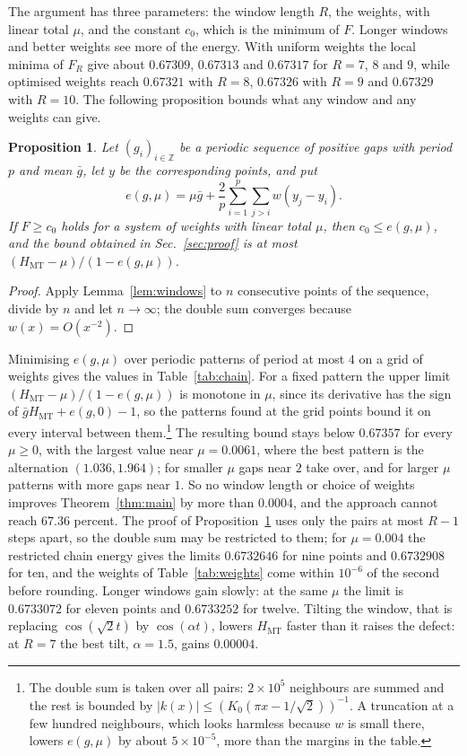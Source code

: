 \documentclass[aps,prd,twocolumn,superscriptaddress,nofootinbib,longbibliography,floatfix,showkeys,amsmath,amssymb,10pt]{revtex4-2}
\newtheorem{proposition}[theorem]{Proposition}
\theoremstyle{definition}
\theoremstyle{remark}
\newcommand{\Z}{\mathbb{Z}}
\newcommand{\MT}{\mathrm{MT}}
\begin{document}
The argument has three parameters: the window length $R$, the weights,
with linear total $\mu$, and the constant $c_0$, which is the minimum of
$F$. Longer windows and better weights see more of the energy. With
uniform weights the local minima of $F_R$ give about $0.67309$, $0.67313$
and $0.67317$ for $R=7$, $8$ and $9$, while optimised weights reach
$0.67321$ with $R=8$, $0.67326$ with $R=9$ and $0.67329$ with $R=10$. The following
proposition bounds what any window and any weights can give.

\begin{proposition}\label{prop:limit}
Let $(g_i)_{i\in\Z}$ be a periodic sequence of positive gaps with period
$p$ and mean $\bar g$, let $y$ be the corresponding points, and put
\[
 e(g,\mu)=\mu\bar g+\frac2p\sum_{i=1}^p\sum_{j>i}w(y_j-y_i).
\]
If $F\ge c_0$ holds for a system of weights with linear total $\mu$, then
$c_0\le e(g,\mu)$, and
the bound obtained in Sec.~\ref{sec:proof} is at most
$(H_\MT-\mu)/(1-e(g,\mu))$.
\end{proposition}

\begin{proof}
Apply Lemma~\ref{lem:windows} to $n$ consecutive points of the sequence,
divide by $n$ and let $n\to\infty$; the double sum converges because
$w(x)=O(x^{-2})$.
\end{proof}

Minimising $e(g,\mu)$ over periodic patterns of period at most $4$ on a
grid of weights gives the values in Table~\ref{tab:chain}. For a fixed
pattern the upper limit $(H_\MT-\mu)/(1-e(g,\mu))$ is monotone in $\mu$,
since its derivative has the sign of $\bar gH_\MT+e(g,0)-1$, so the
patterns found at the grid points bound it on every interval between
them.\footnote{The double sum is taken over all pairs: $2\times10^5$
neighbours are summed and the rest is bounded by
$|k(x)|\le(K_0(\pi x-1/\sqrt2))^{-1}$. A truncation at a few hundred
neighbours, which looks harmless because $w$ is small there, lowers
$e(g,\mu)$ by about $5\times10^{-5}$, more than the margins in the table.}
The resulting bound stays below $0.67357$ for every $\mu\ge0$, with the
largest value near $\mu=0.0061$, where the best pattern is the alternation
$(1.036,1.964)$; for smaller $\mu$ gaps near $2$ take over, and for larger
$\mu$ patterns with more gaps near $1$. So no window length or choice of
weights improves Theorem~\ref{thm:main} by more than $0.0004$, and the
approach cannot reach $67.36$ percent. The proof of
Proposition~\ref{prop:limit} uses only the pairs at most $R-1$ steps apart,
so the double sum may be restricted to them; for $\mu=0.004$
the restricted chain energy gives the limits $0.6732646$ for nine points
and $0.6732908$ for ten, and the weights of Table~\ref{tab:weights} come
within $10^{-6}$ of the second before rounding. Longer windows gain slowly:
at the same $\mu$ the limit is $0.6733072$ for eleven points and
$0.6733252$ for twelve. Tilting
the window, that is replacing $\cos(\sqrt2t)$ by $\cos(\alpha t)$, lowers
$H_\MT$ faster than it raises the defect: at $R=7$ the best tilt,
$\alpha=1.5$, gains $0.00004$.
\end{document}
